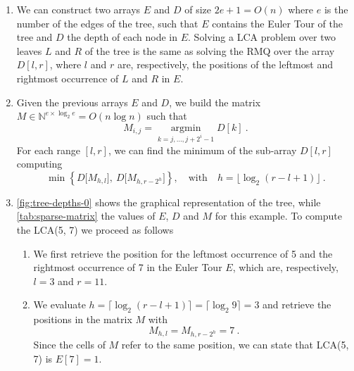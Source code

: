 \solution
%
\begin{enumerate}

  \item We can construct two arrays $E$ and $D$ of size $2e + 1 = O(n)$ where $e$ is
  the number of the edges of the tree, such that  $E$ contains the Euler Tour of
  the tree and $D$ the depth of each node in $E$. Solving a LCA problem over two
  leaves $L$ and $R$ of the tree is the same as solving the RMQ over the array
  $D[l, r]$, where $l$ and $r$ are, respectively, the positions of the leftmost
  and rightmost occurrence of $L$ and $R$ in $E$.

  \item Given the previous arrays $E$ and $D$, we build the matrix $M \in
  \mathbb{N}^{e \times \log_2 e} = O(n\log n)$ such that $$M_{i, j} =
  \operatorname*{argmin}_{k = j, \dots, j + 2^i - 1} D[k]\ .$$ For each range
  $[l, r]$, we can find the minimum of the sub-array $D[l, r]$ computing $$\min
  \left\{ D\big[M_{h, l}\big],\ D\big[M_{h, r - 2^h}\big] \right\}, \quad
  \text{with}\quad h = \lfloor \log_2 (r - l + 1)\rfloor\ .$$

  \item \autoref{fig:tree-depths-0} shows the graphical representation of the
  tree, while \autoref{tab:sparse-matrix} the values of $E$, $D$ and $M$ for
  this example. To compute the LCA(5, 7) we proceed as follows
  \begin{enumerate}

    \item We first retrieve the position for the leftmost occurrence of 5 and
    the rightmost occurrence of 7 in the Euler Tour $E$, which are,
    respectively, $l = 3$ and $r = 11$.

    \item We evaluate $h = \lceil\log_2 (r - l + 1) \rceil = \lceil\log_2 9
    \rceil = 3$ and retrieve the positions in the matrix $M$ with $$M_{h, l} =
    M_{h, r - 2^h} = 7\ .$$ Since the cells of $M$ refer to the same position,
    we can state that LCA(5, 7) is $E[7] = 1$.

  \end{enumerate}
  \begin{figure}[t]
    \centering


\end{figure}
\end{enumerate}
